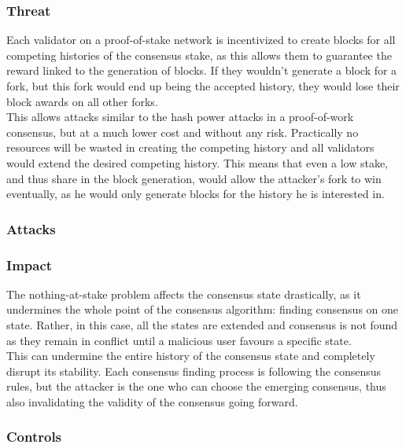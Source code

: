 \documentclass[11pt,a4paper,draft]{article}
\begin{document}
\subsubsection{Threat}

Each validator on a proof-of-stake network is incentivized to create blocks for all competing histories of the consensus stake, as this allows them to guarantee the reward linked to the generation of blocks. If they wouldn't generate a block for a fork, but this fork would end up being the accepted history, they would lose their block awards on all other forks.\\

This allows attacks similar to the hash power attacks in a proof-of-work consensus, but at a much lower cost and without any risk. Practically no resources will be wasted in creating the competing history and all validators would extend the desired competing history. This means that even a low stake, and thus share in the block generation, would allow the attacker's fork to win eventually, as he would only generate blocks for the history he is interested in.\\

\subsubsection{Attacks}

\subsubsection{Impact}

The nothing-at-stake problem affects the consensus state drastically, as it undermines the whole point of the consensus algorithm: finding consensus on one state. Rather, in this case, all the states are extended and consensus is not found as they remain in conflict until a malicious user favours a specific state.\\

This can undermine the entire history of the consensus state and completely disrupt its stability. Each consensus finding process is following the consensus rules, but the attacker is the one who can choose the emerging consensus, thus also invalidating the validity of the consensus going forward.\\

\subsubsection{Controls}
\end{document}
